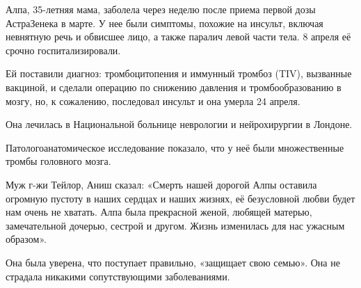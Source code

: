 Алпа, 35-летняя мама, заболела через неделю после приема первой дозы АстраЗенека
в марте. У нее были симптомы, похожие на инсульт, включая невнятную речь и
обвисшее лицо, а также паралич левой части тела. 8 апреля её срочно
госпитализировали.

Ей поставили диагноз: тромбоцитопения и иммунный тромбоз (TIV), вызванные
вакциной, и сделали операцию по снижению давления и тромбообразованию в мозгу,
но, к сожалению, последовал инсульт и она умерла 24 апреля.

Она лечилась в Национальной больнице неврологии и нейрохирургии в Лондоне.

Патологоанатомическое исследование показало, что у неё были множественные тромбы головного мозга.

Муж г-жи Тейлор, Аниш сказал: «Смерть нашей дорогой Алпы оставила огромную
пустоту в наших сердцах и наших жизнях, её безусловной любви будет нам очень не
хватать. Алпа была прекрасной женой, любящей матерью, замечательной дочерью,
сестрой и другом. Жизнь изменилась для нас ужасным образом».

Она была уверена, что поступает правильно, «защищает свою семью». Она не
страдала никакими сопутствующими заболеваниями.

